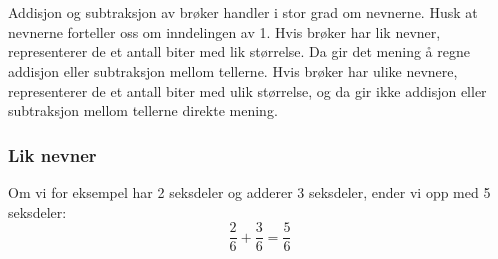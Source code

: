 \section{\bradsub}
Addisjon og subtraksjon av brøker handler i stor grad om nevnerne. Husk at nevnerne forteller oss om inndelingen av 1. Hvis brøker har lik nevner, representerer de et antall biter med lik størrelse. Da gir det mening å regne addisjon eller subtraksjon mellom tellerne. Hvis brøker har ulike nevnere, representerer de et antall biter med ulik størrelse, og da gir ikke addisjon eller subtraksjon mellom tellerne direkte mening.
\subsubsection{Lik nevner}
Om vi for eksempel har 2 seksdeler og adderer 3 seksdeler, ender vi opp med 5 seksdeler:
\[ \frac{2}{6}+\frac{3}{6}=\frac{5}{6} \]
\regv
{}
\newpage
{}
